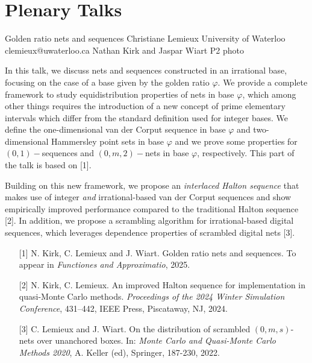 \chapter{Plenary Talks}
\newpage

\begin{talk}
  {Golden ratio nets and sequences}%
  {Christiane Lemieux}%
  {University of Waterloo}%
  {clemieux@uwaterloo.ca}%
  {Nathan Kirk and Jaspar Wiart}%
  {}%
  {}%
  {P2}%
  {photo}%
			

In this talk, we discuss nets and sequences constructed in an irrational base, focusing on the case of a base given by the golden ratio $\varphi$. We provide a complete framework to study equidistribution properties of nets in base $\varphi$, which among other things requires the introduction of a new concept of prime elementary intervals which differ from the standard definition used for integer bases. We define the one-dimensional van der Corput sequence in base $\varphi$ and two-dimensional Hammersley point sets in base $\varphi$ and we prove some properties for $(0,1)-$sequences and $(0,m,2)-$nets in base $\varphi$, respectively. This part of the talk is based on [1].


Building on this new framework, we propose 
an {\em interlaced Halton sequence} that makes use of integer \textit{and} irrational-based van der Corput sequences and show empirically improved performance compared to the traditional Halton sequence [2]. In addition, we propose a scrambling algorithm for irrational-based digital sequences, which leverages dependence properties of scrambled digital nets [3].

\medskip

\begin{enumerate}
	\item[{[1]}] N. Kirk, C. Lemieux and J. Wiart. Golden ratio nets and sequences. To appear in {\em Functiones and Approximatio}, 2025.
	\item[{[2]}] N. Kirk, C. Lemieux. An improved Halton sequence for implementation in quasi-Monte Carlo methods. {\em Proceedings of the 2024 Winter Simulation Conference}, 431--442, IEEE Press, Piscataway, NJ, 2024. 
    \item[{[3]}] C. Lemieux and J. Wiart. On the distribution of scrambled $(0, m, s)$-nets over unanchored
boxes. In: {\em Monte Carlo and Quasi-Monte Carlo Methods 2020}, A. Keller (ed), 
Springer, 187-230, 2022.
\end{enumerate}

\end{talk}

